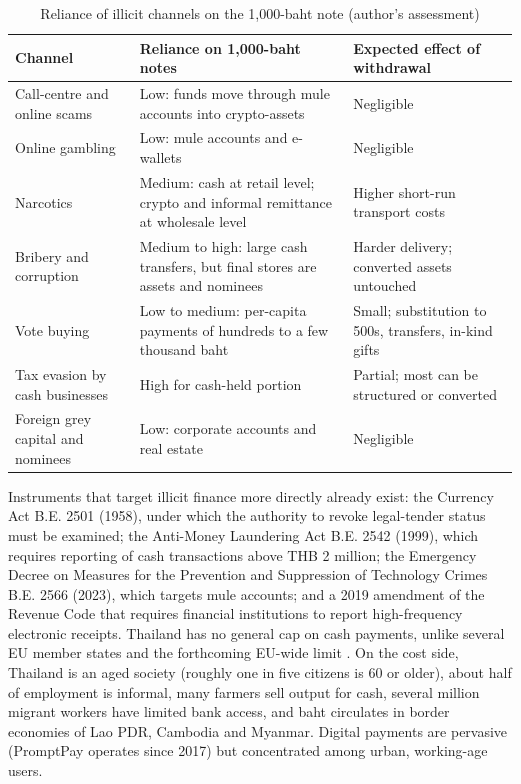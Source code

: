 \documentclass[11pt]{article}
\theoremstyle{definition}
\theoremstyle{remark}
\begin{document}
\begin{table}[!htbp]\centering\footnotesize
\caption{Reliance of illicit channels on the 1,000-baht note (author's assessment)}\label{tab:channels}
\begin{tabularx}{\textwidth}{@{}p{3.6cm}Yp{4.2cm}@{}}
\toprule
Channel & Reliance on 1,000-baht notes & Expected effect of withdrawal\\
\midrule
Call-centre and online scams & Low: funds move through mule accounts into crypto-assets & Negligible\\
Online gambling & Low: mule accounts and e-wallets & Negligible\\
Narcotics & Medium: cash at retail level; crypto and informal remittance at wholesale level & Higher short-run
transport costs\\
Bribery and corruption & Medium to high: large cash transfers, but final stores are assets and nominees & Harder delivery;
converted assets untouched\\
Vote buying & Low to medium: per-capita payments of hundreds to a few thousand baht & Small; substitution to 500s, transfers,
in-kind gifts\\
Tax evasion by cash businesses & High for cash-held portion & Partial; most can be structured or converted\\
Foreign grey capital and nominees & Low: corporate accounts and real estate & Negligible\\
\bottomrule
\end{tabularx}
\end{table}

Instruments that target illicit finance more directly already exist: the Currency Act B.E. 2501 (1958), under which the
authority to revoke legal-tender status must be examined; the Anti-Money Laundering Act B.E. 2542 (1999), which requires
reporting of cash transactions above THB 2 million; the Emergency Decree on Measures for the Prevention and Suppression of
Technology Crimes B.E. 2566 (2023), which targets mule accounts; and a 2019 amendment of the Revenue Code that requires
financial institutions to report high-frequency electronic receipts. Thailand has no general cap on cash payments, unlike
several EU member states and the forthcoming EU-wide limit \citep{amlr2024}. On the cost side, Thailand is an aged society
(roughly one in five citizens is 60 or older), about half of employment is informal, many farmers sell output for cash,
several million migrant workers have limited bank access, and baht circulates in border economies of Lao PDR, Cambodia and
Myanmar. Digital payments are pervasive (PromptPay operates since 2017) but concentrated among urban, working-age users.
\end{document}
